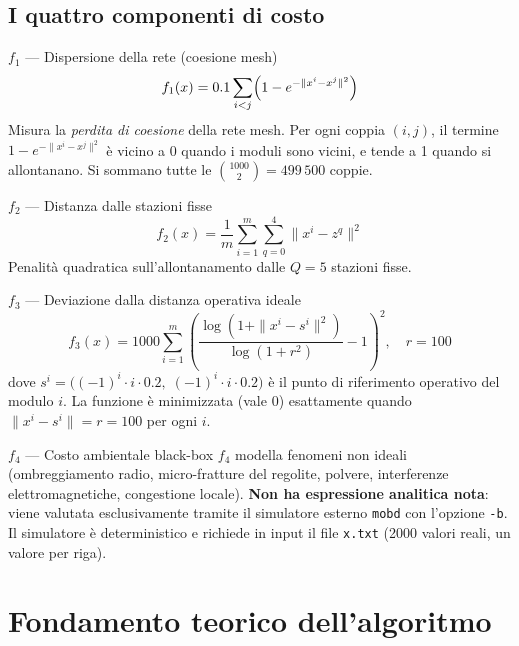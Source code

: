 \documentclass[12pt,a4paper]{article}
\theoremstyle{definition}
\begin{document}
\subsection{I quattro componenti di costo}

\begin{definbox}{$f_1$ — Dispersione della rete (coesione mesh)}
\[
  f_1(x) = 0.1 \sum_{i < j} \Bigl(1 - e^{-\|x^i - x^j\|^2}\Bigr)
\]
Misura la \emph{perdita di coesione} della rete mesh.
Per ogni coppia $(i,j)$, il termine $1 - e^{-\|x^i-x^j\|^2}$ è vicino a 0 quando i moduli sono
vicini, e tende a 1 quando si allontanano. Si sommano tutte le $\binom{1000}{2} = 499\,500$ coppie.
\end{definbox}

\begin{definbox}{$f_2$ — Distanza dalle stazioni fisse}
\[
  f_2(x) = \frac{1}{m} \sum_{i=1}^{m} \sum_{q=0}^{4} \|x^i - z^q\|^2
\]
Penalità quadratica sull'allontanamento dalle $Q=5$ stazioni fisse.
\end{definbox}

\begin{definbox}{$f_3$ — Deviazione dalla distanza operativa ideale}
\[
  f_3(x) = 1000 \sum_{i=1}^{m}
  \left(\frac{\log(1 + \|x^i - s^i\|^2)}{\log(1+r^2)} - 1\right)^2,
  \quad r = 100
\]
dove $s^i = \bigl((-1)^i \cdot i \cdot 0.2,\; (-1)^i \cdot i \cdot 0.2\bigr)$ è il punto di
riferimento operativo del modulo $i$.
La funzione è minimizzata (vale 0) esattamente quando $\|x^i - s^i\| = r = 100$ per ogni $i$.
\end{definbox}

\begin{definbox}{$f_4$ — Costo ambientale black-box}
$f_4$ modella fenomeni non ideali (ombreggiamento radio, micro-fratture del regolite, polvere,
interferenze elettromagnetiche, congestione locale).
\textbf{Non ha espressione analitica nota}: viene valutata esclusivamente tramite il simulatore
esterno \texttt{mobd} con l'opzione \texttt{-b}.
Il simulatore è deterministico e richiede in input il file \texttt{x.txt} (2000 valori reali,
un valore per riga).
\end{definbox}

\section{Fondamento teorico dell'algoritmo}
\end{document}
